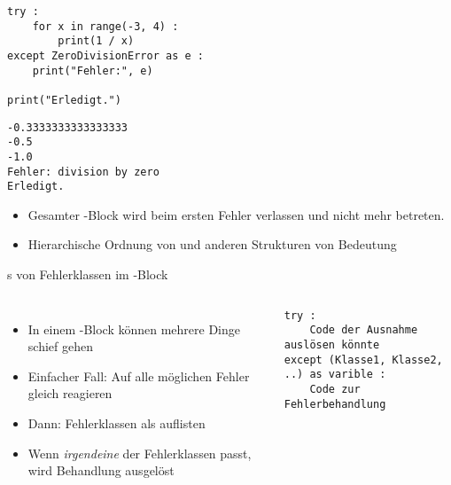 \begin{frame}[fragile]
%
\begin{tcbraster}[raster columns=2,
                  raster equal height,
                  nobeforeafter,
                  raster column skip=0.5cm]
\begin{codebox}
\begin{verbatim}
try :
    for x in range(-3, 4) :
        print(1 / x)
except ZeroDivisionError as e :
    print("Fehler:", e)

print("Erledigt.")
\end{verbatim}
\end{codebox}
%
\begin{cmdbox}
\begin{verbatim}
-0.3333333333333333
-0.5
-1.0
Fehler: division by zero
Erledigt.
\end{verbatim}
\end{cmdbox}
\end{tcbraster}
%
\begin{center}
\begin{itemize}
\item[\Thus] Gesamter -Block wird beim ersten Fehler verlassen und nicht mehr betreten.
\item[\Thus] Hierarchische Ordnung von  und anderen Strukturen von Bedeutung
\end{itemize}
\end{center}
%
\end{frame}


\begin{frame}[fragile]{s von Fehlerklassen im -Block}
%
\begin{columns}[T]
\begin{itemize}
\item In einem -Block können mehrere Dinge schief gehen
\item Einfacher Fall: Auf alle möglichen Fehler gleich reagieren
\item Dann: Fehlerklassen als  auflisten
\item[\Thus] Wenn \emph{irgendeine} der Fehlerklassen passt, wird Behandlung ausgelöst
\end{itemize}
%
\begin{codebox}
\begin{verbatim}
try :
    Code der Ausnahme auslösen könnte
except (Klasse1, Klasse2, ..) as varible :
    Code zur Fehlerbehandlung
\end{verbatim}
\end{codebox}
\end{columns}
%
\end{frame}

